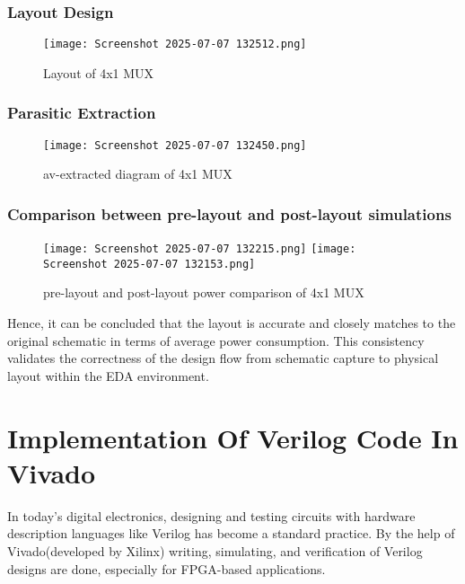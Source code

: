 \documentclass[12pt]{article}
\begin{document}
    \subsubsection{Layout Design}
     \begin{figure}[H]
         \centering
         \texttt{[image: Screenshot 2025-07-07 132512.png]}
         \caption{Layout of 4x1 MUX}
         \label{fig:enter-label}
     \end{figure}
      
    \subsubsection{Parasitic Extraction}
       \begin{figure}[H]
           \centering
           \texttt{[image: Screenshot 2025-07-07 132450.png]}
           \caption{av-extracted diagram of 4x1 MUX}
           \label{fig:enter-label}
       \end{figure}

    \subsubsection{Comparison between pre-layout and post-layout simulations}
      \begin{figure}[H]
          \centering
          \texttt{[image: Screenshot 2025-07-07 132215.png]}
          \texttt{[image: Screenshot 2025-07-07 132153.png]}
          \caption{ pre-layout and post-layout power comparison of 4x1 MUX}
          \label{fig:enter-label}
      \end{figure}
      Hence, it can be concluded that the layout is accurate and closely matches to the original schematic in terms of average power consumption. This consistency validates the correctness of the design flow from schematic capture to physical layout within the EDA environment.
    

\newpage
\section{Implementation Of Verilog Code In Vivado \label{def}}
In today’s digital electronics, designing and testing circuits with hardware description languages like Verilog has become a standard practice. By the help of Vivado(developed by Xilinx) writing, simulating, and verification of Verilog designs are done, especially for FPGA-based applications.
\end{document}
